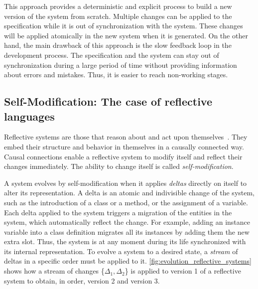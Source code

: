 This approach provides a deterministic and explicit process to build a new version of the system from scratch.
Multiple changes can be applied to the specification while it is out of synchronization with the system.
These changes will be applied atomically in the new system when it is generated.
On the other hand, the main drawback of this approach is the slow feedback loop in the development process.
The specification and the system can stay out of synchronization during a large period of time without providing information about errors and mistakes.
Thus, it is easier to reach non-working stages.



\subsection{Self-Modification: The case of reflective languages}


Reflective systems are those that reason about and act upon themselves~\cite{Smit84a}.
They embed their structure and behavior in themselves in a causally connected way.
Causal connections enable a reflective system to modify itself and reflect their changes immediately.
The ability to change itself is called \emph{self-modification}.

A system evolves by self-modification when it applies \emph{deltas} directly on itself to alter its representation. 
A delta is an atomic and indivisible change of the system, such as the introduction of a class or a method, or the assignment of a variable.
Each delta applied to the system triggers a migration of the entities in the system, which automatically reflect the change.
For example, adding an instance variable into a class definition migrates all its instances by adding them the new extra slot.
Thus, the system is at any moment during its life synchronized with its internal representation.
To evolve a system to a desired state, a \emph{stream} of deltas in a specific order must be applied to it.
\autoref{fig:evolution_reflective_systems} shows how a stream of changes \{$\Delta_1, \Delta_2$\} is applied to version 1 of a reflective system to obtain, in order, version 2 and version 3.

